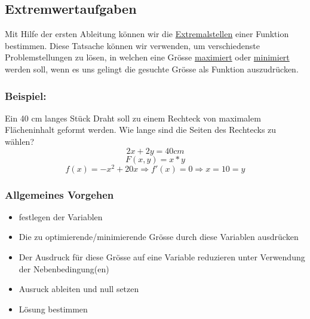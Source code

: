 \documentclass[11pt]{amsart}
\theoremstyle{remark}
\begin{document}
	\begin{figure}[h]
	 \end{figure}\newpage
\subsection{Extremwertaufgaben}
Mit Hilfe der ersten Ableitung k\"onnen wir die \underline{Extremalstellen} einer Funktion bestimmen. Diese Tatsache k\"onnen wir verwenden, um verschiedenste Problemstellungen zu l\"osen, in welchen eine Gr\"osse \underline{maximiert} oder \underline{minimiert} werden soll, wenn es uns gelingt die gesuchte Gr\"osse als Funktion auszudr\"ucken.
\subsubsection*{Beispiel:}
Ein 40 cm langes St\"uck Draht soll zu einem Rechteck von maximalem Fl\"acheninhalt geformt werden. Wie lange sind die Seiten des Rechtecks zu w\"ahlen?
\begin{equation}
	2x+2y=40 cm
\end{equation}
\begin{equation*}
	F(x,y)=x*y
\end{equation*}
\begin{equation*}
	f(x)=-x^2+20x \Rightarrow f'(x)=0 \Rightarrow x= 10 = y
\end{equation*}
\subsubsection*{Allgemeines Vorgehen}
\begin{itemize}
\item festlegen der Variablen
\item Die zu optimierende/minimierende Gr\"osse durch diese Variablen ausdr\"ucken
\item Der Ausdruck f\"ur diese Gr\"osse auf eine Variable reduzieren unter Verwendung der Nebenbedingung(en)
\item Ausruck ableiten und null setzen
\item L\"osung bestimmen
\end{itemize}
\newpage
\end{document}
